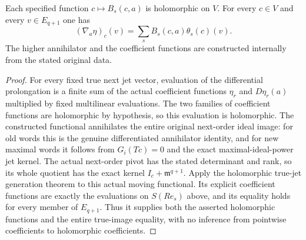 \begin{theorem}
\label{hir:actual-dual-jet-holomorphic-raising-whole-true-image}
\leanok
Each specified function $c\mapsto B_s(c,a)$ is holomorphic on $V$.
For every $c\in V$ and every $v\in E_{q+1}$ one has
\[
 (\nabla_a\eta)_c(v)=\sum_s B_s(c,a)\theta_s(c)(v).
\]
The higher annihilator and the coefficient functions are constructed
internally from the stated original data.
\end{theorem}
\begin{proof}
For every fixed true next jet vector, evaluation of the differential
prolongation is a finite sum of the actual coefficient functions
$\eta_r$ and $D\eta_r(a)$ multiplied by fixed multilinear evaluations.
The two families of coefficient functions are holomorphic by hypothesis,
so this evaluation is holomorphic. The constructed functional annihilates
the entire original next-order ideal image: for old words this is the
genuine differentiated annihilator identity, and for new maximal words
it follows from $G_i(Tc)=0$ and the exact maximal-ideal-power jet kernel.
The actual next-order pivot has the stated determinant and rank, so its
whole quotient has the exact kernel $I_c+\mathfrak m^{q+1}$. Apply the
holomorphic true-jet generation theorem to this actual moving functional.
Its explicit coefficient functions are exactly the evaluations on
$S(R e_s)$ above, and its equality holds for every member of $E_{q+1}$.
Thus it supplies both the asserted holomorphic functions and the entire
true-image equality, with no inference from pointwise coefficients to
holomorphic coefficients.
\end{proof}

